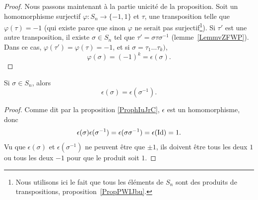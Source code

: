 \begin{proof}
    Nous passons maintenant à la partie unicité de la proposition. Soit un homomorphisme surjectif \( \varphi\colon S_n\to \{ -1,1 \}\) et \( \tau\), une transposition telle que \( \varphi(\tau)=-1\) (qui existe parce que sinon \( \varphi\) ne serait pas surjectif\footnote{Nous utilisons ici le fait que tous les éléments de \( S_n\) sont des produits de transpositions, proposition~\ref{PropPWIJbu}.}). Si \( \tau'\) est une autre transposition, il existe \( \sigma\in S_n\) tel que \( \tau'=\sigma\tau\sigma^{-1}\) (lemme~\ref{LemmvZFWP}). Dans ce cas, \( \varphi(\tau')=\varphi(\tau)=-1\), et si \( \sigma=\tau_1\ldots \tau_k) \),
    \begin{equation}
         \varphi(\sigma)=(-1)^k=\epsilon(\sigma).
    \end{equation}
\end{proof}

\begin{corollary}       \label{CORooZLUKooBOhUPG}
    Si \( \sigma\in S_n\), alors
    \begin{equation}
        \epsilon(\sigma)=\epsilon(\sigma^{-1}).
    \end{equation}
\end{corollary}

\begin{proof}
    Comme dit par la proposition \ref{ProphIuJrC}, \( \epsilon\) est un homomorphisme, donc
    \begin{equation}
        \epsilon(\sigma)\epsilon(\sigma^{-1})=\epsilon(\sigma\sigma^{-1})=\epsilon(\operatorname{Id})=1.
    \end{equation}
    Vu que \( \epsilon(\sigma)\) et \( \epsilon(\sigma^{-1})\) ne peuvent être que \( \pm1\), ils doivent être tous les deux \( 1\) ou tous les deux \( -1\) pour que le produit soit \( 1\).
\end{proof}
